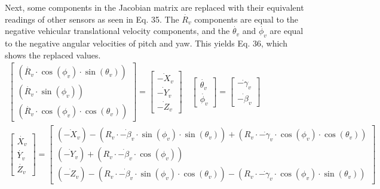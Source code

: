 \documentclass[15pt]{article}
\begin{document}
Next, some components in the Jacobian matrix are replaced with their equivalent readings of other sensors as seen in Eq. 35. The $\dot{R_{v}}$ components are equal to the negative vehicular translational velocity components, and the $\dot{\theta_{v}}$ and $\dot{\phi_{v}}$ are equal to the negative angular velocities of pitch and yaw. This yields Eq. 36, which shows the replaced values.
\begin{gather}
\left[\begin{array}{c}
\left(\dot{R_{v}}\cdot\cos\left(\phi_{v}\right)\cdot\sin\left(\theta_{v}\right)\right)\\
\left(\dot{R_{v}}\cdot\sin\left(\phi_{v}\right)\right)\\
\left(\dot{R_{v}}\cdot\cos\left(\phi_{v}\right)\cdot\cos\left(\theta_{v}\right)\right)
\end{array}\right]=\left[\begin{array}{c}
\dot{-X_{v}}\\
\dot{-Y_{v}}\\
\dot{-Z_{v}}
\end{array}\right]\quad\left[\begin{array}{c}
\dot{\theta_{v}}\\
\dot{\phi_{v}}
\end{array}\right]=\left[\begin{array}{c}
\dot{-\gamma_{v}}\\
\dot{-\beta_{v}}
\end{array}\right] \\
\left[\begin{array}{c}
\dot{X_{v}}\\
\dot{Y_{v}}\\
\dot{Z_{v}}
\end{array}\right]=\left[\begin{array}{c}
\left(\dot{-X_{v}}\right)-\left(R_{v}\cdot\dot{-\beta_{v}}\cdot\sin\left(\phi_{v}\right)\cdot\sin\left(\theta_{v}\right)\right)+\left(R_{v}\cdot\dot{-\gamma_{v}}\cdot\cos\left(\phi_{v}\right)\cdot\cos\left(\theta_{v}\right)\right)\\
\left(\dot{-Y_{v}}\right)+\left(R_{v}\cdot\dot{-\beta_{v}}\cdot\cos\left(\phi_{v}\right)\right)\\
\left(\dot{-Z_{v}}\right)-\left(R_{v}\cdot\dot{-\beta_{v}}\cdot\sin\left(\phi_{v}\right)\cdot\cos\left(\theta_{v}\right)\right)-\left(R_{v}\cdot\dot{-\gamma_{v}}\cdot\cos\left(\phi_{v}\right)\cdot\sin\left(\theta_{v}\right)\right)
\end{array}\right]
\end{gather}
\end{document}
